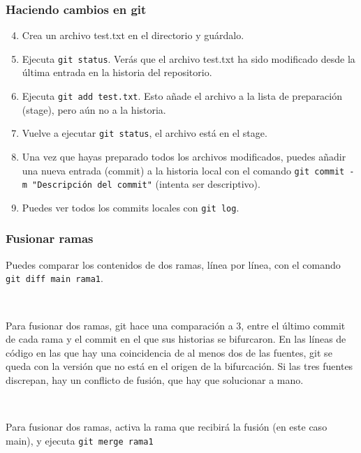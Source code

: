\documentclass[mathserif, 10pt]{beamer}
\begin{document}
\begin{frame}\frametitle{Haciendo cambios en git}
\begin{enumerate}\setcounter{enumi}{3}
\item Crea un archivo test.txt en el directorio y guárdalo.
\item Ejecuta \texttt{git status}. Verás que el archivo test.txt ha sido modificado desde la última entrada en la historia del repositorio.
\item Ejecuta \texttt{git add test.txt}. Esto añade el archivo a la lista de preparación (stage), pero aún no a la historia.
\item Vuelve a ejecutar \texttt{git status}, el archivo está en el stage.
\item Una vez que hayas preparado todos los archivos modificados, puedes añadir una nueva entrada (commit) a la historia local con el comando \texttt{git commit -m "Descripción del commit"} (intenta ser descriptivo).
\item Puedes ver todos los commits locales con \texttt{git log}.
\end{enumerate}
    

\end{frame}

\begin{frame}\frametitle{Fusionar ramas}

    Puedes comparar los contenidos de dos ramas, línea por línea, con el comando \texttt{git diff main rama1}.

    ~

    Para fusionar dos ramas, git hace una comparación a 3, entre el último commit de cada rama y el commit en el que sus historias se bifurcaron. En las líneas de código en las que hay una coincidencia de al menos dos de las fuentes, git se queda con la versión que no está en el origen de la bifurcación. Si las tres fuentes discrepan, hay un conflicto de fusión, que hay que solucionar a mano.

    ~

    Para fusionar dos ramas, activa la rama que recibirá la fusión (en este caso main), y ejecuta \texttt{git merge rama1}

\end{frame}
\end{document}
